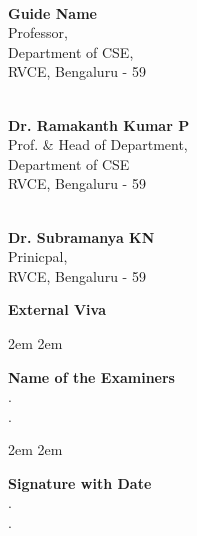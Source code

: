 \begin{center}

	\medskip
	\begin{multicols}{3}

		\columnbreak

		\hrulefill\\
		\textbf{Guide Name}
		\small{
			\\ Professor,
			\\Department of CSE,
			\\RVCE, Bengaluru - 59
		}\\

		\columnbreak

		\hrulefill\\
		\smallskip
		\textbf{Dr. Ramakanth Kumar P}
		\small{
			\\Prof. \& Head of Department,
			\\Department of CSE
			\\RVCE, Bengaluru - 59
		}\\

		\columnbreak

		\hrulefill\\
		\smallskip
		\textbf{Dr. Subramanya KN}
		\small{
			\\Prinicpal,
			\\RVCE, Bengaluru - 59
		}\\
	\end{multicols}


	\bigskip
	\bigskip
	\large \textbf{External Viva}
	\begin{multicols}{2}

		\begingroup
			\leftskip2em
			\rightskip2em

			\normalsize \textbf{Name of the Examiners}
			\\
			. \hrulefill\\
			. \hrulefill\\

		\endgroup

		\columnbreak

		\begingroup
			\leftskip2em
			\rightskip2em

			\normalsize \textbf{Signature with Date} \\
			. \hrulefill\\
			. \hrulefill\\
		\endgroup


	\end{multicols}
\end{center}


